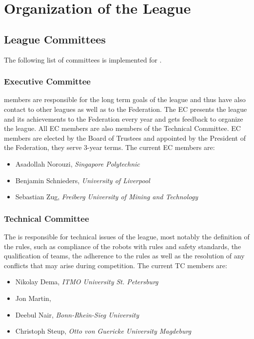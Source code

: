 \section{Organization of the League}\label{sec:organisation_of_the_league}

\subsection{League Committees}
The following list of committees is implemented for \RCAW.

\subsubsection{Executive Committee}

 members are responsible for the long term goals of the league and thus have also contact to other leagues as well as to the \RC Federation. The EC presents the league and its achievements to the \RC Federation every year and gets feedback to organize the league. All EC members are also members of the Technical Committee. EC members are elected by the Board of Trustees and appointed by the President of the \RC Federation, they serve 3-year terms. The current EC members are:

\begin{itemize}
	\item Asadollah Norouzi, \textit{Singapore Polytechnic}
	\item Benjamin Schnieders, \textit{University of Liverpool}
	\item Sebastian Zug, \textit{Freiberg University of Mining and Technology}
\end{itemize}


\subsubsection{Technical Committee}
The  is responsible for technical issues of the league, most notably the definition of the rules, such as compliance of the robots with rules and safety standards, the qualification of teams, the adherence to the rules as well as the resolution of any conflicts that may arise during competition. The current TC members are:

\begin{itemize}
    \item Nikolay Dema, \textit{ITMO University St. Petersburg}
    \item Jon Martin, \textit{}
    \item Deebul Nair, \textit{Bonn-Rhein-Sieg University}
    \item Christoph Steup, \textit{Otto von Guericke University Magdeburg}
\end{itemize}



